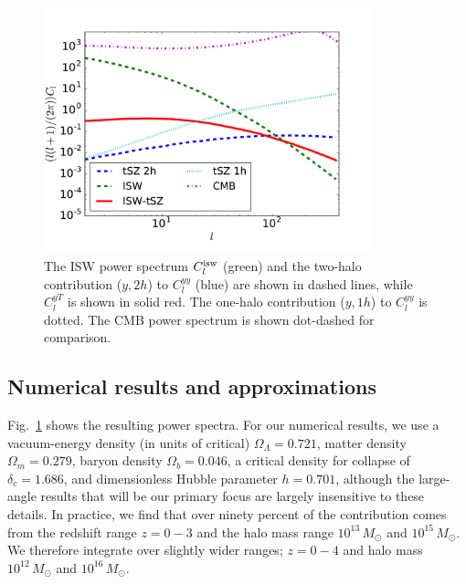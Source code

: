 \documentclass[aps,twocolumn,floats,prd,nofootinbib,10pt,floatfix]{revtex4-1}
\begin{document}
\begin{figure}[h]
\includegraphics[width=9.5cm, height = 7 cm]{ISWtsz.pdf}
    \caption{The ISW power spectrum $C_l^{\rm isw}$ (green) and
    the two-halo contribution ($y,2h$) to $C_l^{yy}$ (blue) are
    shown in dashed
    lines, while $C_l^{yT}$ is shown in solid
    red. The one-halo contribution ($y, 1h$) to $C_l^{yy}$ is
    dotted.  The CMB power spectrum is shown dot-dashed for
    comparison.} 
\label{fig:power}
\end{figure}

\subsection{Numerical results and approximations}

Fig.~\ref{fig:power} shows the resulting power spectra.  
For our numerical results, we use a vacuum-energy density (in
units of critical) $\Omega_{\Lambda} = 0.721$, matter density
$\Omega_m = 0.279$, baryon density $\Omega_b = 0.046$, a
critical density for collapse of $\delta_c = 1.686$, and
dimensionless Hubble parameter $h= 0.701$, although the
large-angle results that will be our primary focus are largely
insensitive to these details. In practice, we find that over ninety percent 
of the contribution comes from the redshift range $z = 0-3$ and the halo mass range 
$10^{13}\,M_\odot$ and $10^{15}\,M_\odot$. 
We therefore integrate over slightly wider ranges; $z=0 - 4$  
and halo mass $10^{12}\,M_\odot$ and $10^{16}\,M_\odot$.
\end{document}
